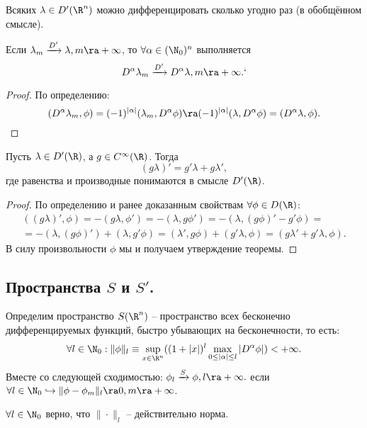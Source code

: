 \begin{note}
    Всяких $\lambda \in D'(\R^n)$ можно дифференцировать сколько угодно раз (в обобщённом смысле).
\end{note}
\begin{lemma}
    Если $\lambda_m \xrightarrow{D'} \lambda, m \ra +\infty$, то $\forall \alpha \in (\N_0)^n$ выполняется
    \[
        D^{\alpha} \lambda_m \xrightarrow{D'} D^{\alpha} \lambda, m \ra +\infty.`
    \]
\end{lemma}
\begin{proof}
    По определению:
    \[
        (D^{\alpha} \lambda_m, \phi) = (-1)^{|\alpha|} (\lambda_m, D^{\alpha} \phi) \ra (-1)^{|\alpha|}(\lambda, D^{\alpha}\phi) = (D^{\alpha} \lambda, \phi).
    \]
\end{proof}
\begin{theorem}
    Пусть $\lambda \in D'(\R)$, а $g \in C^\infty(\R)$.
    Тогда
    \[
        (g\lambda)' = g' \lambda + g \lambda',
    \]
    где равенства и производные понимаются в смысле $D'(\R)$.
\end{theorem}
\begin{proof}
    По определению и ранее доказанным свойствам $\forall \phi \in D(\R)$:
    \begin{multline*}
        ((g\lambda)', \phi) = -(g \lambda, \phi') = -(\lambda, g \phi') = -(\lambda, (g\phi)' - g'\phi) = \\ = -(\lambda, (g\phi)') + (\lambda, g' \phi) = (\lambda', g\phi) + (g'\lambda, \phi) = (g\lambda' + g'\lambda, \phi).
    \end{multline*}
    В силу произвольности $\phi$ мы и получаем утверждение теоремы.
\end{proof}
\subsection{Пространства $S$ и $S'$.}
\begin{definition}
    Определим пространство $S(\R^n)$ -- пространство всех бесконечно дифференцируемых функций, быстро убывающих на бесконечности, то есть:
    \[
        \forall l \in \N_0: \|\phi\|_l \equiv \sup\limits_{x \in \R^n} ((1 + |x|)^l \max\limits_{0 \leq |\alpha| \leq l} |D^{\alpha} \phi|) < +\infty.
    \]
    Вместе со следующей сходимостью:
        $\phi_l \xrightarrow{S} \phi, l \ra +\infty.$
    если $\forall l \in \N_0 \hookrightarrow \|\phi - \phi_m\|_l \ra 0, m \ra +\infty$.
\end{definition}
\begin{note}
    $\forall l \in \N_0$ верно, что $\|\cdot \|_l$ -- действительно норма.
\end{note}

